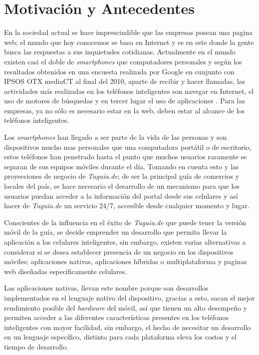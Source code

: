 \section{Motivación y Antecedentes} \label{sect:motivacion}

En la sociedad actual se hace imprescindible que las empresas posean una pagina web; el mundo que hoy conocemos se basa en Internet y es en este donde la gente busca las respuestas a sus inquietudes cotidianas. Actualmente en el mundo existen casi el doble de \textit{smartphones} que computadores personales \cite{DGT} y según los resultados obtenidos en una encuesta realizada por Google en cunjunto con IPSOS OTX mediaCT al final del 2010, aparte de recibir y hacer llamadas, las actividades más realizadas en los teléfonos inteligentes son navegar en Internet, el uso de motores de búsquedas y en tercer lugar el uso de aplicaciones \cite{TMM}. Para las empresas, ya no sólo es necesario estar en la web, deben estar al alcance de los teléfonos inteligentes.

Los \textit{smartphones} han llegado a ser parte de la vida de las personas y son dispositivos mucho mas personales que una computadora portátil o de escritorio, estos teléfonos han penetrado hasta el punto que muchos usuarios raramente se separan de sus equipos móviles durante el día. Tomando en cuenta esto y las proyecciones de negocio de \textit{Tuguia.de}; de ser la principal guía de comercios y locales del país, se hace necesario el desarrollo de un mecanismo para que los usuarios puedan acceder a la información del portal desde sus celulares y así hacer de \textit{Tuguia.de} un servicio 24/7, accesible desde cualquier momento y lugar.

Conscientes de la influencia en el éxito de \textit{Tuguia.de} que puede tener la versión móvil de la guía, se decide emprender un desarrollo que permita llevar la aplicación a los celulares inteligentes, sin embargo, existen varias alternativas a considerar si se desea establecer presencia de un negocio en los dispositivos móviles; aplicaciones nativas, aplicaciones híbridas o multiplataforma y paginas web diseñadas específicamente celulares.

Las aplicaciones nativas, llevan este nombre porque son desarrollos implementados en el lenguaje nativo del dispositivo, gracias a esto, sacan el mejor rendimiento posible del \textit{hardware} del móvil, así que tienen un alto desempeño y permiten acceder a las diferentes características presentes en los teléfonos inteligentes con mayor facilidad, sin embargo, el hecho de necesitar un desarrollo en un lenguaje específico, distinto para cada plataforma eleva los costos y el tiempo de desarrollo. 

